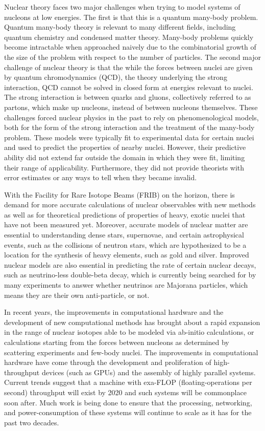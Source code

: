Nuclear theory faces two major challenges when trying to model systems of nucleons at low energies. The first is that this is a quantum many-body problem. Quantum many-body theory is relevant to many different fields, including quantum chemistry and condensed matter theory. Many-body problems quickly become intractable when approached naively due to the combinatorial growth of the size of the problem with respect to the number of particles. The second major challenge of nuclear theory is that the while the forces between nuclei are given by quantum chromodynamics (QCD), the theory underlying the strong interaction, QCD cannot be solved in closed form at energies relevant to nuclei. The strong interaction is between quarks and gluons, collectively referred to as partons, which make up nucleons, instead of between nucleons themselves. These challenges forced nuclear physics in the past to rely on phenomenological models, both for the form of the strong interaction and the treatment of the many-body problem. These models were typically fit to experimental data for certain nuclei and used to predict the properties of nearby nuclei. However, their predictive ability did not extend far outside the domain in which they were fit, limiting their range of applicability. Furthermore, they did not provide theorists with error estimates or any ways to tell when they became invalid.

With the Facility for Rare Isotope Beams (FRIB) on the horizon, there is demand for more accurate calculations of nuclear observables with new methods as well as for theoretical predictions of properties of heavy, exotic nuclei that have not been measured yet. Moreover, accurate models of nuclear matter are essential to understanding dense stars, supernovae, and certain astrophysical events, such as the collisions of neutron stars, which are hypothesized to be a location for the synthesis of heavy elements, such as gold and silver. Improved nuclear models are also essential in predicting the rate of certain nuclear decays, such as neutrino-less double-beta decay, which is currently being searched for by many experiments to answer whether neutrinos are Majorana particles, which means they are their own anti-particle, or not.

In recent years, the improvements in computational hardware and the development of new computational methods has brought about a rapid expansion in the range of nuclear isotopes able to be modeled via ab-initio calculations, or calculations starting from the forces between nucleons as determined by scattering experiments and few-body nuclei. The improvements in computational hardware have come through the development and proliferation of high-throughput devices (such as GPUs) and the assembly of highly parallel systems. Current trends suggest that a machine with exa-FLOP (floating-operations per second) throughput will exist by 2020 and such systems will be commonplace soon after. Much work is being done to ensure that the processing, networking, and power-consumption of these systems will continue to scale as it has for the past two decades. 

